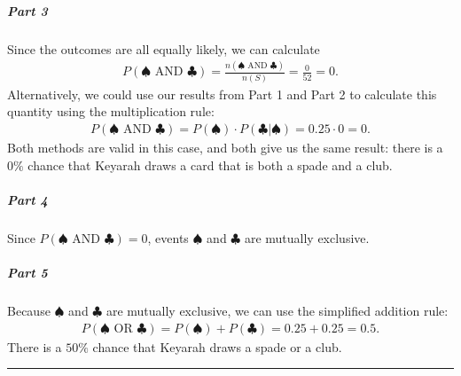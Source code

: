 \documentclass[letterpaper,10pt,english]{jupyterBook}
\begin{document}
\subparagraph{Part 3}
\label{\detokenize{Ch3 Probability/3.4 Addition Rules and Mutually Exclusive Events:part-3}}
\sphinxAtStartPar
Since the outcomes are all equally likely, we can calculate
\begin{equation*}
\begin{split}P(♠ \text{ AND } ♣) = \frac{n(♠ \text{ AND } ♣)}{n(S)} = \frac{0}{52} = 0. \end{split}
\end{equation*}
\sphinxAtStartPar
Alternatively, we could use our results from Part 1 and Part 2 to calculate this quantity using the multiplication rule:
\begin{equation*}
\begin{split}P(♠ \text{ AND } ♣) = P(♠) \cdot P(♣|♠) = 0.25 \cdot 0 = 0. \end{split}
\end{equation*}
\sphinxAtStartPar
Both methods are valid in this case, and both give us the same result: there is a \(0\%\) chance that Keyarah draws a card that is both a spade and a club.


\subparagraph{Part 4}
\label{\detokenize{Ch3 Probability/3.4 Addition Rules and Mutually Exclusive Events:part-4}}
\sphinxAtStartPar
Since \(P(♠ \text{ AND } ♣) = 0\), events \(♠\) and \(♣\) are mutually exclusive.


\subparagraph{Part 5}
\label{\detokenize{Ch3 Probability/3.4 Addition Rules and Mutually Exclusive Events:part-5}}
\sphinxAtStartPar
Because \(♠\) and \(♣\) are mutually exclusive, we can use the simplified addition rule:
\begin{equation*}
\begin{split} P(♠ \text{ OR } ♣) = P(♠) + P(♣) = 0.25 + 0.25 = 0.5. \end{split}
\end{equation*}
\sphinxAtStartPar
There is a \(50\%\) chance that Keyarah draws a spade or a club.


\bigskip\hrule\bigskip
\end{document}
